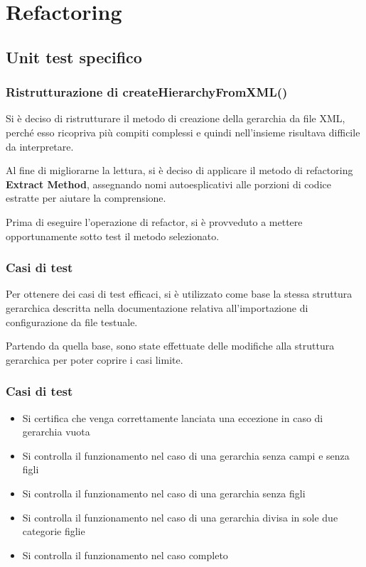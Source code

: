 
\section{Refactoring}

\subsection{Unit test specifico}
\begin{frame}
    \frametitle{Ristrutturazione di createHierarchyFromXML()}
    Si è deciso di ristrutturare il metodo di creazione della gerarchia da file XML, perché esso ricopriva più compiti complessi e quindi nell'insieme risultava difficile da interpretare.\pause

    Al fine di migliorarne la lettura, si è deciso di applicare il metodo di refactoring \textbf{Extract Method}, assegnando nomi autoesplicativi alle porzioni di codice estratte per aiutare la comprensione.\pause

    Prima di eseguire l'operazione di refactor, si è provveduto a mettere opportunamente sotto test il metodo selezionato.
\end{frame}

\begin{frame}[allowframebreaks]
    \frametitle{Casi di test}
    Per ottenere dei casi di test efficaci, si è utilizzato come base la stessa struttura gerarchica descritta nella documentazione relativa all'importazione di configurazione da file testuale.\pause

    Partendo da quella base, sono state effettuate delle modifiche alla struttura gerarchica per poter coprire i casi limite.
\end{frame}

\begin{frame}
    \frametitle{Casi di test}
    \begin{itemize}
        \item <1-> Si certifica che venga correttamente lanciata una eccezione in caso di gerarchia vuota
        \item <2-> Si controlla il funzionamento nel caso di una gerarchia senza campi e senza figli
        \item <3-> Si controlla il funzionamento nel caso di una gerarchia senza figli
        \item <4-> Si controlla il funzionamento nel caso di una gerarchia divisa in sole due categorie figlie
        \item <5-> Si controlla il funzionamento nel caso completo
    \end{itemize}
\end{frame}

